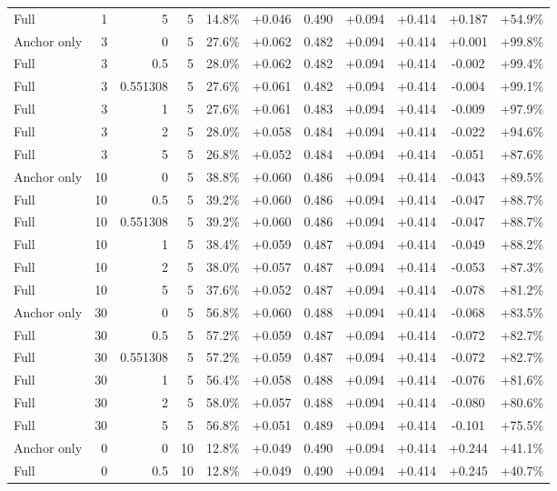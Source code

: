 \begin{table}[htbp]
\begin{tabular}{lrrrccccccc}
Full & 1 & 5 & 5 & 14.8\% & +0.046 & 0.490 & +0.094 & +0.414 & +0.187 & +54.9\% \\
Anchor only & 3 & 0 & 5 & 27.6\% & +0.062 & 0.482 & +0.094 & +0.414 & +0.001 & +99.8\% \\
Full & 3 & 0.5 & 5 & 28.0\% & +0.062 & 0.482 & +0.094 & +0.414 & -0.002 & +99.4\% \\
Full & 3 & 0.551308 & 5 & 27.6\% & +0.061 & 0.482 & +0.094 & +0.414 & -0.004 & +99.1\% \\
Full & 3 & 1 & 5 & 27.6\% & +0.061 & 0.483 & +0.094 & +0.414 & -0.009 & +97.9\% \\
Full & 3 & 2 & 5 & 28.0\% & +0.058 & 0.484 & +0.094 & +0.414 & -0.022 & +94.6\% \\
Full & 3 & 5 & 5 & 26.8\% & +0.052 & 0.484 & +0.094 & +0.414 & -0.051 & +87.6\% \\
Anchor only & 10 & 0 & 5 & 38.8\% & +0.060 & 0.486 & +0.094 & +0.414 & -0.043 & +89.5\% \\
Full & 10 & 0.5 & 5 & 39.2\% & +0.060 & 0.486 & +0.094 & +0.414 & -0.047 & +88.7\% \\
Full & 10 & 0.551308 & 5 & 39.2\% & +0.060 & 0.486 & +0.094 & +0.414 & -0.047 & +88.7\% \\
Full & 10 & 1 & 5 & 38.4\% & +0.059 & 0.487 & +0.094 & +0.414 & -0.049 & +88.2\% \\
Full & 10 & 2 & 5 & 38.0\% & +0.057 & 0.487 & +0.094 & +0.414 & -0.053 & +87.3\% \\
Full & 10 & 5 & 5 & 37.6\% & +0.052 & 0.487 & +0.094 & +0.414 & -0.078 & +81.2\% \\
Anchor only & 30 & 0 & 5 & 56.8\% & +0.060 & 0.488 & +0.094 & +0.414 & -0.068 & +83.5\% \\
Full & 30 & 0.5 & 5 & 57.2\% & +0.059 & 0.487 & +0.094 & +0.414 & -0.072 & +82.7\% \\
Full & 30 & 0.551308 & 5 & 57.2\% & +0.059 & 0.487 & +0.094 & +0.414 & -0.072 & +82.7\% \\
Full & 30 & 1 & 5 & 56.4\% & +0.058 & 0.488 & +0.094 & +0.414 & -0.076 & +81.6\% \\
Full & 30 & 2 & 5 & 58.0\% & +0.057 & 0.488 & +0.094 & +0.414 & -0.080 & +80.6\% \\
Full & 30 & 5 & 5 & 56.8\% & +0.051 & 0.489 & +0.094 & +0.414 & -0.101 & +75.5\% \\
Anchor only & 0 & 0 & 10 & 12.8\% & +0.049 & 0.490 & +0.094 & +0.414 & +0.244 & +41.1\% \\
Full & 0 & 0.5 & 10 & 12.8\% & +0.049 & 0.490 & +0.094 & +0.414 & +0.245 & +40.7\% \\

\end{tabular}
\end{table}
